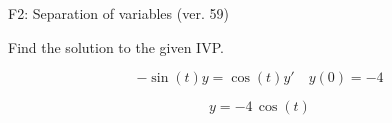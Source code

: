 \begin{exercise}
  \begin{exerciseTitle}F2: Separation of variables (ver. 59)\end{exerciseTitle}
  \begin{exerciseStatement}
    
Find the solution to the given IVP.

    
\[-\sin\left(t\right) y= \cos\left(t\right) y'\hspace{1em} y\left( 0 \right)= -4\]

  \end{exerciseStatement}
  \begin{exerciseAnswer}
    
\[y= -4 \, \cos\left(t\right)\]

  \end{exerciseAnswer}
\end{exercise}